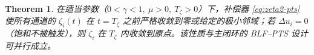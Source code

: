 \documentclass[pdflatex,sn-mathphys-num]{sn-jnl}%
\theoremstyle{thmstyleone}%
\newtheorem{theorem}{Theorem}%
\theoremstyle{thmstyletwo}%
\newtheorem{remark}{Remark}%
\theoremstyle{thmstylethree}%
\begin{document}




\begin{theorem}\label{thm:u-only}
	在适当参数（$0<\gamma<1,\ \mu>0,\ T_\zeta>0$）下，补偿器 \eqref{eq:zeta2-pts} 使所有通道的 $\zeta_{i}(t)$ 在 $t=T_\zeta$ 之前严格收敛到零或给定的极小邻域；若 $\Delta u_i= 0$（饱和不被触发），则 $\zeta_{i}$ 在 $T_\zeta$ 内收敛到原点。该性质与主闭环的 BLF–PTS 设计可并行成立。
	\end{theorem}
	
\end{document}
